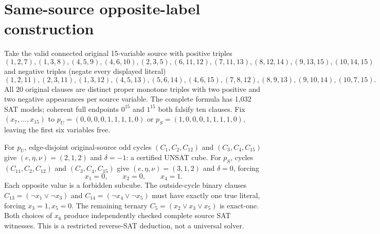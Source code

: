 \documentclass[11pt]{article}
\begin{document}
\section{Same-source opposite-label construction}
Take the valid connected original 15-variable source with positive triples
\[
(1,2,7),(1,3,8),(4,5,9),(4,6,10),(2,3,5),
(6,11,12),(7,11,13),(8,12,14),(9,13,15),(10,14,15)
\]
and negative triples (negate every displayed literal)
\[
(1,2,11),(2,3,11),(1,3,12),(4,5,13),(5,6,14),
(4,6,15),(7,8,12),(8,9,13),(9,10,14),(10,7,15).
\]
All 20 original clauses are distinct proper monotone triples with two positive and two negative appearances per source variable. The complete formula has 1,032 SAT models; coherent full endpoints $0^{15}$ and $1^{15}$ both falsify ten clauses. Fix $(x_7,\ldots,x_{15})$ to $p_U=(0,0,0,0,1,1,1,1,0)$ or $p_S=(1,0,0,0,1,1,1,1,0)$, leaving the first six variables free.

For $p_U$, edge-disjoint original-source odd cycles $(C_1,C_2,C_{12})$ and $(C_3,C_4,C_{15})$ give $(e,\eta,\nu)=(2,1,2)$ and $\delta=-1$: a certified UNSAT cube. For $p_S$, cycles $(C_{11},C_2,C_{12})$ and $(C_3,C_4,C_{15})$ give $(e,\eta,\nu)=(3,1,2)$ and $\delta=0$, forcing
\[
\boxed{x_1=0,\qquad x_2=0,\qquad x_4=1.}
\]
Each opposite value is a forbidden subcube. The outside-cycle binary clauses $C_{13}=(\neg x_1\lor\neg x_3)$ and $C_{14}=(\neg x_4\lor\neg x_5)$ must have exactly one true literal, forcing $x_3=1,x_5=0$. The remaining ternary $C_5=(x_2\lor x_3\lor x_5)$ is exact-one. Both choices of $x_6$ produce independently checked complete source SAT witnesses. This is a restricted reverse-SAT deduction, not a universal solver.
\end{document}
